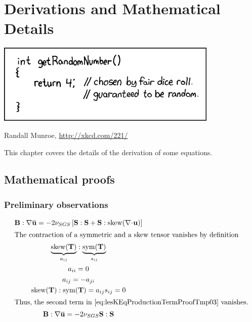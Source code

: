 \chapter[Derivations]{Derivations and Mathematical Details}
\label{app:derivation}
\epigraph{
	\includegraphics[width=\textwidth]{images/random_number}
}{Randall Munroe, \url{http://xkcd.com/221/}}

This chapter covers the details of the derivation of some equations.



\section{Mathematical proofs}
\label{app:mathProofs}


\subsection{Preliminary observations}

\begin{gather}
	\mathbf{B} : \nabla\overbar{\mathbf{u}} =  - 2 \nu_{SGS} \left[ \mathbf{S} : \mathbf{S}
		+ \mathbf{S} : \Tskew(\mathbf{\nabla\mycdot\mathbf{u}}) \right] 
		\label{eq:lesKEqProductionTermProofTmp03} \\
	\intertext{The contraction of a symmetric and a skew tensor vanishes by definition}
	\underbrace{\Tskew(\mathbf{T})}_{a_{ij}}:\underbrace{\Tsym(\mathbf{T})}_{s_{ij}} \\
	a_{ii} = 0 \\
	a_{ij} = -a_{ji} \\
	\Tskew(\mathbf{T}):\Tsym(\mathbf{T}) = a_{ij} s_{ij} = 0 \\
	\intertext{Thus, the second term in \eqref{eq:lesKEqProductionTermProofTmp03} vanishes.}
	\mathbf{B} : \nabla\overbar{\mathbf{u}} =  - 2 \nu_{SGS} \mathbf{S} : \mathbf{S} 
\end{gather}
